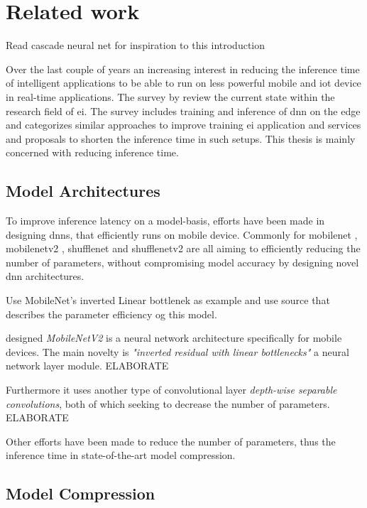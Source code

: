 \section{Related work}

Read cascade neural net for inspiration to this introduction

Over the last couple of years an increasing interest in reducing the inference time of intelligent applications to be able to run on less powerful mobile and \gls{iot} device in real-time applications. The survey  by \citet{zhou_edge_2019} review the current state within the research field of \gls{ei}. The survey includes training and inference of \gls{dnn} on the edge and categorizes similar approaches to improve training \gls{ei} application and services and proposals to shorten the inference time in such setups. This thesis is mainly concerned with reducing inference time.

\subsection{Model Architectures}

To improve inference latency on a model-basis, efforts have been made in designing \gls{dnn}s, that efficiently runs on mobile device. Commonly for \gls{mobilenet} \cite{howard_mobilenets:_2017}, \gls{mobilenetv2} \cite{sandler_mobilenetv2:_2018}, \gls{shufflenet} \cite{zhang_shufflenet:_2017} and \gls{shufflenetv2} \cite{ma_shufflenet_2018} are all aiming to efficiently reducing the number of parameters, without compromising model accuracy by designing novel \gls{dnn} architectures.

Use MobileNet's inverted Linear bottlenek as example and use source that describes the parameter efficiency og this model. 

\citeauthor{sandler_mobilenetv2:_2018} designed \textsl{MobileNetV2} is a neural network architecture specifically for mobile devices. The main novelty is \textit{"inverted residual with linear bottlenecks"} a neural network layer module. ELABORATE

Furthermore it uses another type of convolutional layer \textit{depth-wise separable convolutions}, both of which seeking to decrease the number of parameters. ELABORATE

Other efforts have been made to reduce the number of parameters, thus the inference time in state-of-the-art model compression. 

\subsection{Model Compression}

